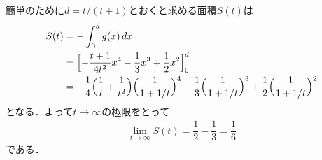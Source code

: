 \documentclass[../../main.tex]{subfiles}
\begin{document}
簡単のために$d=t/(t+1)$とおくと求める面積$S(t)$は
\begin{align}
  S(t)
  &=-\int_0^dg(x)\,dx\\
  &=\Bigl[-\dfrac{t+1}{4t^2}x^4-\dfrac{1}{3}x^3+\dfrac{1}{2}x^2\Bigr]_0^d\\
  &=-\dfrac{1}{4}\Bigl(\dfrac{1}{t}+\dfrac{1}{t^2}\Bigr)
  \Bigl(\dfrac{1}{1+1/t}\Bigr)^4
  -\dfrac{1}{3}\Bigl(\dfrac{1}{1+1/t}\Bigr)^3
  +\dfrac{1}{2}\Bigl(\dfrac{1}{1+1/t}\Bigr)^2
\end{align}
となる．よって$t\to\infty$の極限をとって
\begin{align}
  \lim_{t\to\infty}S(t)=\dfrac{1}{2}-\dfrac{1}{3}=\dfrac{1}{6}
\end{align}
である．

\newpage
\end{document}
